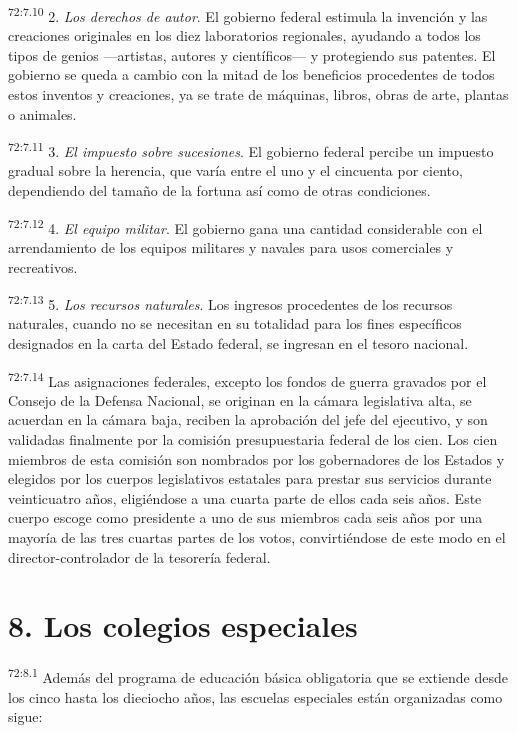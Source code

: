 \par
\textsuperscript{72:7.10} 2. \textit{Los derechos de autor}. El gobierno federal estimula la invención y las creaciones originales en los diez laboratorios regionales, ayudando a todos los tipos de genios ---artistas, autores y científicos--- y protegiendo sus patentes. El gobierno se queda a cambio con la mitad de los beneficios procedentes de todos estos inventos y creaciones, ya se trate de máquinas, libros, obras de arte, plantas o animales.

\par
\textsuperscript{72:7.11} 3. \textit{El impuesto sobre sucesiones}. El gobierno federal percibe un impuesto gradual sobre la herencia, que varía entre el uno y el cincuenta por ciento, dependiendo del tamaño de la fortuna así como de otras condiciones.

\par
\textsuperscript{72:7.12} 4. \textit{El equipo militar}. El gobierno gana una cantidad considerable con el arrendamiento de los equipos militares y navales para usos comerciales y recreativos.

\par
\textsuperscript{72:7.13} 5. \textit{Los recursos naturales}. Los ingresos procedentes de los recursos naturales, cuando no se necesitan en su totalidad para los fines específicos designados en la carta del Estado federal, se ingresan en el tesoro nacional.

\par
\textsuperscript{72:7.14} Las asignaciones federales, excepto los fondos de guerra gravados por el Consejo de la Defensa Nacional, se originan en la cámara legislativa alta, se acuerdan en la cámara baja, reciben la aprobación del jefe del ejecutivo, y son validadas finalmente por la comisión presupuestaria federal de los cien. Los cien miembros de esta comisión son nombrados por los gobernadores de los Estados y elegidos por los cuerpos legislativos estatales para prestar sus servicios durante veinticuatro años, eligiéndose a una cuarta parte de ellos cada seis años. Este cuerpo escoge como presidente a uno de sus miembros cada seis años por una mayoría de las tres cuartas partes de los votos, convirtiéndose de este modo en el director-controlador de la tesorería federal.

\section*{8. Los colegios especiales}
\par
\textsuperscript{72:8.1} Además del programa de educación básica obligatoria que se extiende desde los cinco hasta los dieciocho años, las escuelas especiales están organizadas como sigue:

